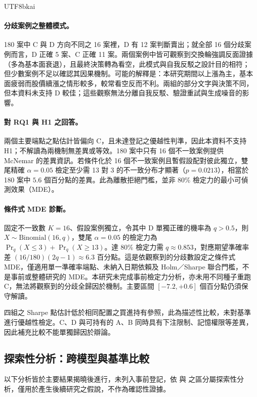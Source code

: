 \documentclass[12pt,a4paper]{article}
\newcommand{\grp}[1]{\textsf{#1}}
\begin{document}
\begin{CJK}{UTF8}{bkai}
\paragraph{分歧案例之整體模式。} 180 案中 \grp{C} 與 \grp{D} 方向不同之 16 案裡，\grp{D} 有 12 案判斷賣出；就全部 16 個分歧案例而言，\grp{D} 正確 5 案、\grp{C} 正確 11 案。兩個案例中皆可觀察到交換輪強調反面證據（多為基本面衰退），且最終決策轉為看空，此模式與自我反駁之設計目的相符；但少數案例不足以確認其因果機制。可能的解釋是：本研究期間以上漲為主，基本面疲弱而股價續漲之情形較多，較常看空反而不利。兩組的部分文字與決策不同，但本資料未支持 \grp{D} 較佳；這些觀察無法分離自我反駁、驗證重試與生成噪音的影響。

\paragraph{對 RQ1 與 H1 之回答。} 兩個主要端點之點估計皆偏向 \grp{C}，且未達登記之優越性判準，因此本資料不支持 H1；不解讀為兩機制無差異或等效。180 案中只有 16 個不一致案例提供 McNemar 的差異資訊。若條件化於 16 個不一致案例且暫假設配對彼此獨立，雙尾精確 $\alpha=0.05$ 檢定至少需 13 對 3 的不一致分布才顯著（$p=0.0213$），相當於 180 案中 $5.6$ 個百分點的差異。此為離散拒絕門檻，並非 80\% 檢定力的最小可偵測效果（MDE）。

\paragraph{條件式 MDE 診斷。} 固定不一致數 $K=16$、假設案例獨立，令其中 \grp{D} 單獨正確的機率為 $q>0.5$，則 $X\sim\mathrm{Binomial}(16,q)$，雙尾 $\alpha=0.05$ 的檢定力為 $\Pr_q(X\leq3)+\Pr_q(X\geq13)$。達 80\% 檢定力需 $q\approx0.853$，對應期望準確率差 $(16/180)(2q-1)\approx6.3$ 百分點。這是依觀察到的分歧數設定之條件式 MDE，僅適用單一準確率端點、未納入日期依賴及 Holm／Sharpe 聯合門檻，不是事前或整體研究的 MDE。本研究未完成事前檢定力分析，亦未用不同種子重跑 \grp{C}，無法將觀察到的分歧全歸因於機制。主要區間 $[-7.2,+0.6]$ 個百分點仍須保守解讀。

四組之 Sharpe 點估計低於相同配置之買進持有參照，此為描述性比較，未對基準進行優越性檢定。\grp{C}、\grp{D} 與可持有的 \grp{A}、\grp{B} 同時具有下注限制、記憶權限等差異，因此補充比較不能單獨歸因於辯論。

\subsection{探索性分析：跨模型與基準比較}
\label{sec:exploratory}

以下分析皆於主要結果揭曉後進行，未列入事前登記，依 \citet{wagenmakers2012agenda} 與 \citet{nosek2018prereg} 之區分屬探索性分析，僅用於產生後續研究之假說，不作為確認性證據。


\end{CJK}
\end{document}
